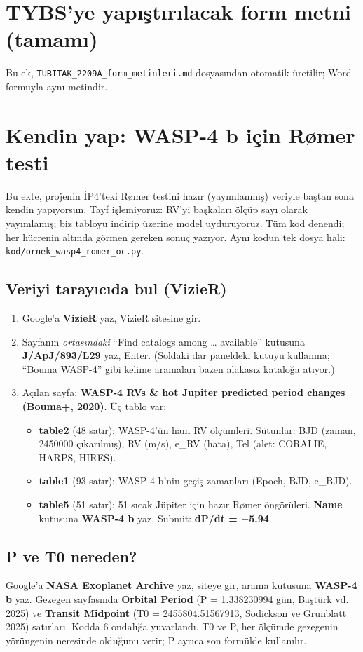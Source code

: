 \documentclass[11pt,a4paper]{article}
\begin{document}
\appendix
\section{TYBS'ye yapıştırılacak form metni (tamamı)}
Bu ek, \texttt{TUBITAK\_2209A\_form\_metinleri.md} dosyasından otomatik üretilir; Word formuyla aynı metindir.


\section{Kendin yap: WASP-4 b için Rømer testi}
Bu ekte, projenin İP4'teki Rømer testini hazır (yayımlanmış) veriyle baştan sona kendin yapıyorsun. Tayf işlemiyoruz: RV'yi başkaları ölçüp sayı olarak yayımlamış; biz tabloyu indirip üzerine model uyduruyoruz. Tüm kod denendi; her hücrenin altında görmen gereken sonuç yazıyor. Aynı kodun tek dosya hali: \texttt{kod/ornek\_wasp4\_romer\_oc.py}.

\subsection{Veriyi tarayıcıda bul (VizieR)}
\begin{enumerate}
\item Google'a \textbf{VizieR} yaz, VizieR sitesine gir.
\item Sayfanın \emph{ortasındaki} ``Find catalogs among \ldots{} available'' kutusuna \textbf{J/ApJ/893/L29} yaz, Enter. (Soldaki dar paneldeki kutuyu kullanma; ``Bouma WASP-4'' gibi kelime aramaları bazen alakasız kataloğa atıyor.)
\item Açılan sayfa: \textbf{WASP-4 RVs \& hot Jupiter predicted period changes (Bouma+, 2020)}. Üç tablo var:
  \begin{itemize}
  \item \textbf{table2} (48 satır): WASP-4'ün ham RV ölçümleri. Sütunlar: BJD (zaman, 2450000 çıkarılmış), RV (m/s), e\_RV (hata), Tel (alet: CORALIE, HARPS, HIRES).
  \item \textbf{table1} (93 satır): WASP-4 b'nin geçiş zamanları (Epoch, BJD, e\_BJD).
  \item \textbf{table5} (51 satır): 51 sıcak Jüpiter için hazır Rømer öngörüleri. \textbf{Name} kutusuna \textbf{WASP-4 b} yaz, Submit: \textbf{dP/dt = $-$5.94}.
  \end{itemize}
\end{enumerate}

\subsection{P ve T0 nereden?}
Google'a \textbf{NASA Exoplanet Archive} yaz, siteye gir, arama kutusuna \textbf{WASP-4 b} yaz. Gezegen sayfasında \textbf{Orbital Period} (P = 1.338230994 gün, Baştürk vd. 2025) ve \textbf{Transit Midpoint} (T0 = 2455804.51567913, Sodickson ve Grunblatt 2025) satırları. Kodda 6 ondalığa yuvarlandı. T0 ve P, her ölçümde gezegenin yörüngenin neresinde olduğunu verir; P ayrıca son formülde kullanılır.
\end{document}
